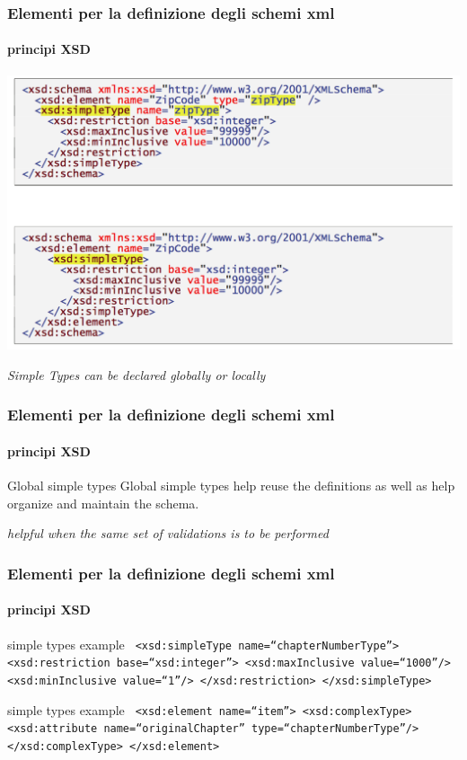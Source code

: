 \begin{frame}
	\frametitle{Elementi per la definizione degli schemi xml}
	\framesubtitle{principi XSD}
	\addtocounter{nframe}{1}

	\begin{center}
		\includegraphics[width=.95\textwidth]{imgs/SimpleTypeGlobalLocal.png}
	\end{center}

	\textit{Simple Types can be declared globally or locally}

\end{frame}


\begin{frame}
	\frametitle{Elementi per la definizione degli schemi xml}
	\framesubtitle{principi XSD}
	\addtocounter{nframe}{1}

	\begin{block}{Global simple types}
		Global simple types help reuse the definitions as well as help organize and maintain the schema.
	\end{block}

	\textit{helpful when the same set of validations is to be performed}

\end{frame}


\begin{frame}
	\frametitle{Elementi per la definizione degli schemi xml}
	\framesubtitle{principi XSD}
	\addtocounter{nframe}{1}

	\begin{block}{simple types example}
		\texttt{
			<xsd:simpleType name=``chapterNumberType''>
			<xsd:restriction base=``xsd:integer''>
			<xsd:maxInclusive value=``1000''/>
			<xsd:minInclusive value=``1''/>
			</xsd:restriction>
			</xsd:simpleType>
		}
	\end{block}

	\begin{block}{simple types example}
		\texttt{
			<xsd:element name=``item''>
			<xsd:complexType>
			<xsd:attribute name=``originalChapter'' type=``chapterNumberType''/>
			</xsd:complexType>
			</xsd:element>
		}
	\end{block}
\end{frame}



